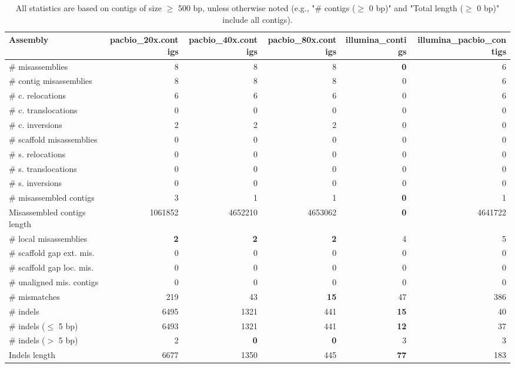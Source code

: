 \documentclass[12pt,a4paper]{article}
\begin{document}
\begin{table}[ht]
\begin{center}
\caption{All statistics are based on contigs of size $\geq$ 500 bp, unless otherwise noted (e.g., "\# contigs ($\geq$ 0 bp)" and "Total length ($\geq$ 0 bp)" include all contigs).}
\begin{tabular}{|l*{5}{|r}|}
\hline
Assembly & pacbio\_20x.contigs & pacbio\_40x.contigs & pacbio\_80x.contigs & illumina\_contigs & illumina\_pacbio\_contigs \\ \hline
\# misassemblies & 8 & 8 & 8 & {\bf 0} & 6 \\ \hline
\hspace{2mm}\# contig misassemblies & 8 & 8 & 8 & 0 & 6 \\ \hline
\hspace{5mm}\# c. relocations & 6 & 6 & 6 & 0 & 6 \\ \hline
\hspace{5mm}\# c. translocations & 0 & 0 & 0 & 0 & 0 \\ \hline
\hspace{5mm}\# c. inversions & 2 & 2 & 2 & 0 & 0 \\ \hline
\hspace{2mm}\# scaffold misassemblies & 0 & 0 & 0 & 0 & 0 \\ \hline
\hspace{5mm}\# s. relocations & 0 & 0 & 0 & 0 & 0 \\ \hline
\hspace{5mm}\# s. translocations & 0 & 0 & 0 & 0 & 0 \\ \hline
\hspace{5mm}\# s. inversions & 0 & 0 & 0 & 0 & 0 \\ \hline
\# misassembled contigs & 3 & 1 & 1 & {\bf 0} & 1 \\ \hline
Misassembled contigs length & 1061852 & 4652210 & 4653062 & {\bf 0} & 4641722 \\ \hline
\# local misassemblies & {\bf 2} & {\bf 2} & {\bf 2} & 4 & 5 \\ \hline
\# scaffold gap ext. mis. & 0 & 0 & 0 & 0 & 0 \\ \hline
\# scaffold gap loc. mis. & 0 & 0 & 0 & 0 & 0 \\ \hline
\# unaligned mis. contigs & 0 & 0 & 0 & 0 & 0 \\ \hline
\# mismatches & 219 & 43 & {\bf 15} & 47 & 386 \\ \hline
\# indels & 6495 & 1321 & 441 & {\bf 15} & 40 \\ \hline
\hspace{5mm}\# indels ($\leq$ 5 bp) & 6493 & 1321 & 441 & {\bf 12} & 37 \\ \hline
\hspace{5mm}\# indels ($>$ 5 bp) & 2 & {\bf 0} & {\bf 0} & 3 & 3 \\ \hline
Indels length & 6677 & 1350 & 445 & {\bf 77} & 183 \\ \hline
\end{tabular}
\end{center}
\end{table}
\end{document}
